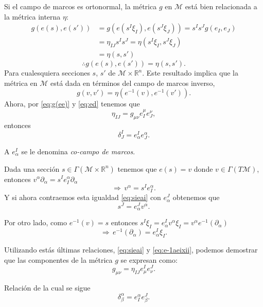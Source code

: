 Si el campo de marcos es ortonormal, la m\'{e}trica $g$ en $\mathcal{M}$ est\'{a} bien relacionada a la m\'{e}trica interna $\eta$:
%
\begin{align*}
g(e(s), e(s')) & = g(e(s^{I} \xi_{I}), e(s^{J} \xi_{J})) = s^{I} s^{J} g(e_{I}, e_{J}) \\
& = \eta_{IJ} s^{I} s^{J} = \eta(s^{I} \xi_{I}, s^{J} \xi_{J}) \\
& = \eta(s,s')
\end{align*}
%
\begin{equation}
\therefore g(e(s), e(s')) = \eta(s,s').
\end{equation}
%
Para cualesquiera secciones $s$, $s'$ de $\mathcal{M} \times \mathbb{R}^{n}$. Este resultado implica que la m\'{e}trica en $\mathcal{M}$ est\'{a} dada en t\'{e}rminos del campo de marcos inverso,
%
\begin{equation}
g(v, v') = \eta(e^{-1}(v), e^{-1}(v')).
\end{equation}
%
Ahora, por \eqref{eq:g(ee)} y \eqref{eq:ed} tenemos que
%
\begin{equation}
\eta_{IJ} = g_{\mu \nu} e^{\mu}_{I} e^{\nu}_{J},
\end{equation}
%
entonces
%
\begin{equation}
\delta^{I}_{J} = e^{I}_{\alpha} e^{\alpha}_{J}.
\end{equation}

A $e^{I}_{\alpha}$ se le denomina \emph{co-campo de marcos}\footnotemark.

Dada una secci\'{o}n $s \in \Gamma(\mathcal{M} \times \mathbb{R}^{n})$ tenemos que $e(s) = v$ donde $v \in \Gamma(T \mathcal{M})$, entonces $v^{\alpha} \partial_{\alpha} = s^{I} e^{\alpha}_{I} \partial_{\alpha}$
%
\begin{equation}
\label{eq:sieai}
\Longrightarrow \, v^{\alpha} = s^{I}e^{\alpha}_{I}.
\end{equation}
%
Y si ahora contraemos esta igualdad \eqref{eq:sieai} con $e^{J}_{\alpha}$ obtenemos que
%
\begin{equation}
s^{J} = e^{J}_{\alpha} v^{\alpha}.
\end{equation}

Por otro lado, como $e^{-1}(v) = s$ entonces $s^{I} \xi_{I} = e^{I}_{\alpha} v^{\alpha} \xi_{I} = v^{\alpha} e^{-1}(\partial_{\alpha})$
%
\begin{equation}
\label{eq:e-1aeixii}
\Longrightarrow \, e^{-1}(\partial_{\alpha}) = e^{I}_{\alpha} \xi_{I}.
\end{equation}

Utilizando est\'{a}s \'{u}ltimas relaciones, \eqref{eq:sieai} y \eqref{eq:e-1aeixii}, podemos demostrar que las componentes de la m\'{e}trica $g$ se expresan como:
%
\begin{equation}
g_{\mu \nu} = \eta_{IJ} e^{I}_{\mu} e^{J}_{\nu}.
\end{equation}

Relaci\'{o}n de la cual se sigue
%
\begin{equation}
\delta^{\alpha}_{\beta} = e_{I}^{\alpha} e^{J}_{\beta}.
\end{equation}